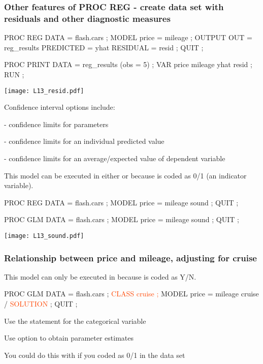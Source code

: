 \begin{frame}[fragile]
\frametitle{Other features of PROC REG - create data set with residuals and other diagnostic measures}
\footnotesize
\begin{code}{.0}
PROC REG DATA = flash.cars ;
   MODEL price = mileage ;
   OUTPUT OUT = reg_results PREDICTED = yhat RESIDUAL = resid ;
QUIT ;

PROC PRINT DATA = reg_results (obs = 5) ;
    VAR price mileage yhat resid ;
RUN ;
\end{code}
\vskip5pt
\texttt{[image: L13\_resid.pdf]}
\emp
\end{frame}

\begin{frame}
\vskip10pt
Confidence interval options include:
\bi
\item {} - confidence limits for parameters
\item {} - confidence limits for an individual predicted value
\item {} - confidence limits for an average/expected value of dependent variable
\ei
\end{frame}


\begin{frame}[fragile]
This model can be executed in either  or  because  is coded as 0/1 (an indicator variable).
\vskip10pt
\footnotesize
\begin{code}{.0}
PROC REG DATA = flash.cars ;
   MODEL price = mileage sound ;
QUIT ;

PROC GLM DATA = flash.cars ;
  MODEL price = mileage sound ;
QUIT ;
\end{code}
\emp
{} \hspace{1in} \emp
{}
\texttt{[image: L13\_sound.pdf]}
\emp
\end{frame}

\begin{frame}[fragile]
\frametitle{Relationship between price and mileage, adjusting for cruise}
This model can only be executed in  because  is coded as Y/N.
\vskip5pt
\footnotesize
\begin{code}{.0}
PROC GLM DATA = flash.cars ;
  \textcolor{OrangeRed}{CLASS cruise ;}
  MODEL price = mileage cruise / \textcolor{OrangeRed}{SOLUTION} ;
QUIT ;
\end{code}
\emp
\vskip5pt
\bi
\item Use the  statement for the categorical variable
\item Use  option to obtain parameter estimates
\item You could do this with  if you coded  as 0/1 in the data set
\ei
\end{frame}

